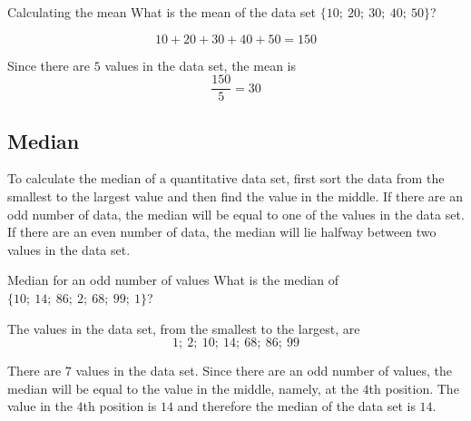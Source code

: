 \begin{wex}{Calculating the mean}{
    What is the mean of the data set $\{10;\ 20;\ 30;\ 40;\ 50\}$?
}{
  \begin{equation}
    10 + 20 + 30 + 40 + 50 = 150
  \end{equation}


  Since there are $5$ values in the data set, the mean is
  \begin{equation}
    \frac{150}{5} = 30
  \end{equation}
}
\end{wex}

\subsection{Median}

To calculate the median of a quantitative data set, first sort the
data from the smallest to the largest value and then find the value in
the middle. If there are an odd number of data, the median will be
equal to one of the values in the data set. If there are an even
number of data, the median will lie halfway between two values in
the data set.

\begin{wex}{Median for an odd number of values}{
  What is the median of $\{10;\ 14;\ 86;\ 2;\ 68;\ 99;\ 1\}$?
}{

  The values in the data set, from the smallest to the largest, are
  \begin{equation}
    1;\ 2;\ 10;\ 14;\ 68;\ 86;\ 99
  \end{equation}


  There are $7$ values in the data set. Since there are an odd number
  of values, the median will be equal to the value in the middle,
  namely, at the $4$th position. The value in the $4$th position is
  $14$ and therefore the median of the data set is $14$.

}
\end{wex}

